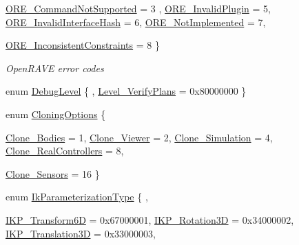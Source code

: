 \begin{DoxyCompactItemize}
\hyperlink{namespaceOpenRAVE_adf2fa050995e80f643f8eddc14d7262cad33c9bd2b6b21be295e2a983f19e6006}{ORE\_\-CommandNotSupported} = 3
, \hyperlink{namespaceOpenRAVE_adf2fa050995e80f643f8eddc14d7262cab6eaf97936dda5f10b34d8106c929270}{ORE\_\-InvalidPlugin} = 5, 
\hyperlink{namespaceOpenRAVE_adf2fa050995e80f643f8eddc14d7262caea76ef8a6aa70c082da2d9dfeaaa2ed5}{ORE\_\-InvalidInterfaceHash} = 6, 
\hyperlink{namespaceOpenRAVE_adf2fa050995e80f643f8eddc14d7262cac8a3a340f3efbef5161746764a523a35}{ORE\_\-NotImplemented} = 7, 
\par
\hyperlink{namespaceOpenRAVE_adf2fa050995e80f643f8eddc14d7262caefba8dc1666cec415519f11ca1a6699b}{ORE\_\-InconsistentConstraints} = 8
 \}
\begin{DoxyCompactList}\small\item\em OpenRAVE error codes \item\end{DoxyCompactList}\item 
enum \hyperlink{namespaceOpenRAVE_ab658e6d84759440dbf3c890446075395}{DebugLevel} \{ , \hyperlink{namespaceOpenRAVE_ab658e6d84759440dbf3c890446075395a7ff14d37cfb2aeb879feb53b506cabde}{Level\_\-VerifyPlans} = 0x80000000
 \}
\item 
enum \hyperlink{namespaceOpenRAVE_a16bea31a72c441a002538eac01a118f2}{CloningOptions} \{ \par
\hyperlink{namespaceOpenRAVE_a16bea31a72c441a002538eac01a118f2a0c49bf8f6cc2b8f1731b1aa8326c5e63}{Clone\_\-Bodies} =  1, 
\hyperlink{namespaceOpenRAVE_a16bea31a72c441a002538eac01a118f2a63f15f42828f381ffc43e2c3a894e792}{Clone\_\-Viewer} =  2, 
\hyperlink{namespaceOpenRAVE_a16bea31a72c441a002538eac01a118f2a4f7d3c1c073424a486131d5516cbee6a}{Clone\_\-Simulation} =  4, 
\hyperlink{namespaceOpenRAVE_a16bea31a72c441a002538eac01a118f2a0f3adf019cab24fd7564e167aac6308b}{Clone\_\-RealControllers} =  8, 
\par
\hyperlink{namespaceOpenRAVE_a16bea31a72c441a002538eac01a118f2add1ddf3837f8e9fe41aa04fbdf1f10b1}{Clone\_\-Sensors} =  16
 \}
\item 
enum \hyperlink{namespaceOpenRAVE_a16f7833e516a35d385ac594a44e44a2e}{IkParameterizationType} \{ , \par
\hyperlink{namespaceOpenRAVE_a16f7833e516a35d385ac594a44e44a2ea33b4f04338b6d55fe993b6bdd9f66956}{IKP\_\-Transform6D} = 0x67000001, 
\hyperlink{namespaceOpenRAVE_a16f7833e516a35d385ac594a44e44a2ea125270b64ed51a89e7021ec7e6d71669}{IKP\_\-Rotation3D} = 0x34000002, 
\hyperlink{namespaceOpenRAVE_a16f7833e516a35d385ac594a44e44a2eae24724faf9388c7f2ae2c7cbbc9c5e94}{IKP\_\-Translation3D} = 0x33000003, 

\end{DoxyCompactItemize}
